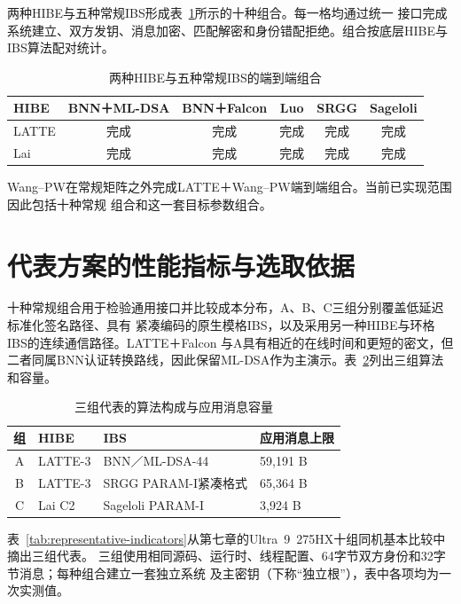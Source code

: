 两种HIBE与五种常规IBS形成表~\ref{tab:implemented-matrix}所示的十种组合。每一格均通过统一
接口完成系统建立、双方发钥、消息加密、匹配解密和身份错配拒绝。组合按底层HIBE与IBS算法配对统计。

\begin{table}[H]
\centering\small
\caption{两种HIBE与五种常规IBS的端到端组合}
\label{tab:implemented-matrix}
\begin{tabular}{@{}lccccc@{}}
\toprule
\rowcolor{black!8} HIBE & BNN＋ML-DSA & BNN＋Falcon & Luo & SRGG & Sageloli \\
\midrule
LATTE & 完成 & 完成 & 完成 & 完成 & 完成 \\
Lai & 完成 & 完成 & 完成 & 完成 & 完成 \\
\bottomrule
\end{tabular}
\end{table}

Wang--PW在常规矩阵之外完成LATTE＋Wang--PW端到端组合。当前已实现范围因此包括十种常规
组合和这一套目标参数组合。

\section{代表方案的性能指标与选取依据}

十种常规组合用于检验通用接口并比较成本分布，A、B、C三组分别覆盖低延迟标准化签名路径、具有
紧凑编码的原生模格IBS，以及采用另一种HIBE与环格IBS的连续通信路径。LATTE＋Falcon
与A具有相近的在线时间和更短的密文，但二者同属BNN认证转换路线，因此保留ML-DSA作为主演示。表~\ref{tab:representatives}列出三组算法和容量。

\begin{table}[H]
\centering\small
\caption{三组代表的算法构成与应用消息容量}
\label{tab:representatives}
\begin{tabularx}{\textwidth}{@{}cp{}Xp{}@{}}
\toprule
\rowcolor{black!8} 组 & HIBE & IBS & 应用消息上限 \\
\midrule
A & LATTE-3 & BNN／ML-DSA-44 & 59,191 B \\
B & LATTE-3 & SRGG PARAM-I紧凑格式 & 65,364 B \\
C & Lai C2 & Sageloli PARAM-I & 3,924 B \\
\bottomrule
\end{tabularx}

\end{table}

表~\ref{tab:representative-indicators}从第七章的Ultra~9~275HX十组同机基本比较中摘出三组代表。
三组使用相同源码、运行时、线程配置、64字节双方身份和32字节消息；每种组合建立一套独立系统
及主密钥（下称“独立根”），表中各项均为一次实测值。

